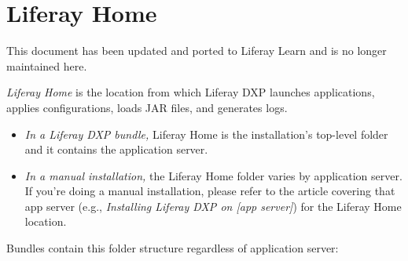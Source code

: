 \chapter{Liferay Home}\label{liferay-home}

{This document has been updated and ported to Liferay Learn and is no
longer maintained here.}

\emph{Liferay Home} is the location from which Liferay DXP launches
applications, applies configurations, loads JAR files, and generates
logs.

\begin{itemize}
\item
  \emph{In a Liferay DXP bundle,} Liferay Home is the installation's
  top-level folder and it contains the application server.
\item
  \emph{In a manual installation,} the Liferay Home folder varies by
  application server. If you're doing a manual installation, please
  refer to the article covering that app server (e.g., \emph{Installing
  Liferay DXP on {[}app server{]}}) for the Liferay Home location.
\end{itemize}

Bundles contain this folder structure regardless of application server:

